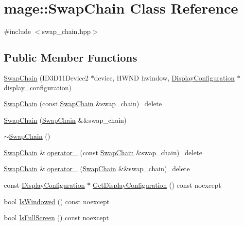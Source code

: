 \hypertarget{classmage_1_1_swap_chain}{}\section{mage\+:\+:Swap\+Chain Class Reference}
\label{classmage_1_1_swap_chain}


{\ttfamily \#include $<$swap\+\_\+chain.\+hpp$>$}

\subsection*{Public Member Functions}
\begin{DoxyCompactItemize}
\item 
\hyperlink{classmage_1_1_swap_chain_a039bcb99605d47802d0efc24292f2cfa}{Swap\+Chain} (I\+D3\+D11\+Device2 $\ast$device, H\+W\+ND hwindow, \hyperlink{structmage_1_1_display_configuration}{Display\+Configuration} $\ast$display\+\_\+configuration)
\item 
\hyperlink{classmage_1_1_swap_chain_a85d5da233182a273705b4fa1c419a0aa}{Swap\+Chain} (const \hyperlink{classmage_1_1_swap_chain}{Swap\+Chain} \&swap\+\_\+chain)=delete
\item 
\hyperlink{classmage_1_1_swap_chain_add0b68e7ce2f6eb857a4ad9c7e01eb83}{Swap\+Chain} (\hyperlink{classmage_1_1_swap_chain}{Swap\+Chain} \&\&swap\+\_\+chain)
\item 
\hyperlink{classmage_1_1_swap_chain_a853168cba69cadc3d8c10ad2f4939e72}{$\sim$\+Swap\+Chain} ()
\item 
\hyperlink{classmage_1_1_swap_chain}{Swap\+Chain} \& \hyperlink{classmage_1_1_swap_chain_a8ea6de219f37d447487d7d3b4bbd5867}{operator=} (const \hyperlink{classmage_1_1_swap_chain}{Swap\+Chain} \&swap\+\_\+chain)=delete
\item 
\hyperlink{classmage_1_1_swap_chain}{Swap\+Chain} \& \hyperlink{classmage_1_1_swap_chain_a4335d4e0869c43a66bfce5f2d0d6f34c}{operator=} (\hyperlink{classmage_1_1_swap_chain}{Swap\+Chain} \&\&swap\+\_\+chain)=delete
\item 
const \hyperlink{structmage_1_1_display_configuration}{Display\+Configuration} $\ast$ \hyperlink{classmage_1_1_swap_chain_afb7cf408081f09d0241f3e764a047e74}{Get\+Display\+Configuration} () const noexcept
\item 
bool \hyperlink{classmage_1_1_swap_chain_a7cf71ec46d0af888b9b1daa890a54d39}{Is\+Windowed} () const noexcept
\item 
bool \hyperlink{classmage_1_1_swap_chain_a85873ca586fbcd83c237692a011d6d08}{Is\+Full\+Screen} () const noexcept

\end{DoxyCompactItemize}
